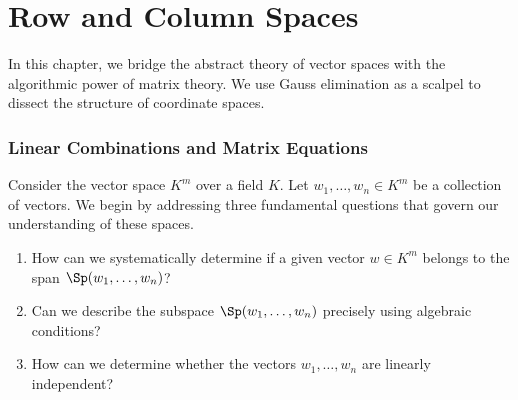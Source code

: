 \setcounter{chapter}{12} %
\renewcommand{\thetheorem}{\thechapter.\arabic{theorem}}
\setcounter{theorem}{0}

\chapter{Row and Column Spaces}

In this chapter, we bridge the abstract theory of vector spaces with the algorithmic power of matrix theory. We use Gauss elimination as a scalpel to dissect the structure of coordinate spaces.

\subsection{Linear Combinations and Matrix Equations}

Consider the vector space $K^{m}$ over a field $K$. Let $w_{1}, \dots, w_{n} \in K^{m}$ be a collection of vectors. We begin by addressing three fundamental questions that govern our understanding of these spaces.

\begin{question}
\label{q:foundational_questions}
\begin{enumerate}
    \item How can we systematically determine if a given vector $w \in K^{m}$ belongs to the span $\Sp(w_{1}, \dots, w_{n})$?
    \item Can we describe the subspace $\Sp(w_{1}, \dots, w_{n})$ precisely using algebraic conditions?
    \item How can we determine whether the vectors $w_{1}, \dots, w_{n}$ are linearly independent?
\end{enumerate}
\end{question}

